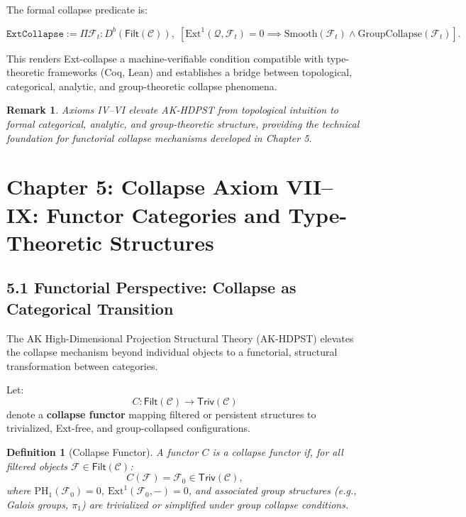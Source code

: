 \documentclass[11pt]{article}
\newtheorem{definition}[theorem]{Definition}
\newtheorem{remark}[theorem]{Remark}
\begin{document}
The formal collapse predicate is:

\[
\texttt{ExtCollapse} := \Pi \mathcal{F}_t : D^b(\mathsf{Filt}(\mathcal{C})),\; \left[
\mathrm{Ext}^1(\mathcal{Q}, \mathcal{F}_t) = 0 \implies \mathrm{Smooth}(\mathcal{F}_t) \wedge \mathrm{GroupCollapse}(\mathcal{F}_t)
\right].
\]

This renders Ext-collapse a machine-verifiable condition compatible with type-theoretic frameworks (Coq, Lean) and establishes a bridge between topological, categorical, analytic, and group-theoretic collapse phenomena.

\begin{remark}
Axioms IV–VI elevate AK-HDPST from topological intuition to formal categorical, analytic, and group-theoretic structure, providing the technical foundation for functorial collapse mechanisms developed in Chapter 5.
\end{remark}



\section{Chapter 5: Collapse Axiom VII--IX: Functor Categories and Type-Theoretic Structures}

\subsection*{5.1 Functorial Perspective: Collapse as Categorical Transition}

The AK High-Dimensional Projection Structural Theory (AK-HDPST) elevates the collapse mechanism beyond individual objects to a functorial, structural transformation between categories.

Let:
\[
C: \mathsf{Filt}(\mathcal{C}) \longrightarrow \mathsf{Triv}(\mathcal{C})
\]
denote a \textbf{collapse functor} mapping filtered or persistent structures to trivialized, Ext-free, and group-collapsed configurations.

\begin{definition}[Collapse Functor]
A functor \( C \) is a collapse functor if, for all filtered objects \( \mathcal{F} \in \mathsf{Filt}(\mathcal{C}) \):
\[
C(\mathcal{F}) = \mathcal{F}_0 \in \mathsf{Triv}(\mathcal{C}),
\]
where \( \mathrm{PH}_1(\mathcal{F}_0) = 0 \), \( \mathrm{Ext}^1(\mathcal{F}_0, -) = 0 \), and associated group structures (e.g., Galois groups, \(\pi_1\)) are trivialized or simplified under group collapse conditions.
\end{definition}
\end{document}

